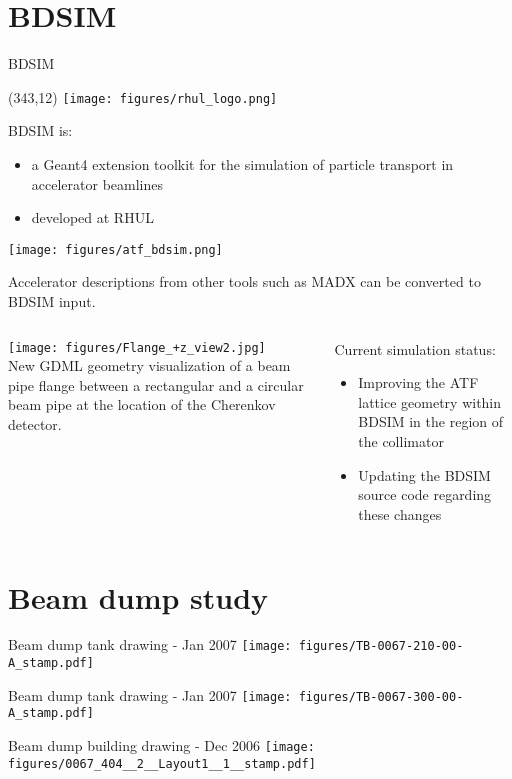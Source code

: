 \documentclass[xcolor={dvipsnames}]{beamer}
\newcommand{\rhullogo}{
  \setlength{\TPHorizModule}{1pt}
  \setlength{\TPVertModule}{1pt}
  \begin{textblock}{1}(343,12)
   \texttt{[image: figures/rhul\_logo.png]}
  \end{textblock}
}
\begin{document}
\section{BDSIM}
\begin{frame}{BDSIM}
\rhullogo
BDSIM is:
\begin{itemize}
 \item a Geant4 extension toolkit for the simulation of particle transport in accelerator beamlines
 \item developed at RHUL
\end{itemize}
 \begin{center}
 \texttt{[image: figures/atf\_bdsim.png]}
\end{center}
Accelerator descriptions from other tools such as MADX can be converted to BDSIM input.
\begin{columns}
 \begin{column}[b]{0.35\textwidth}
  \centering
   \texttt{[image: figures/Flange\_+z\_view2.jpg]}\\
   \tiny New GDML geometry visualization of a beam pipe flange between a rectangular and a circular beam
pipe at the location of the Cherenkov detector.
 \end{column}
 \begin{column}[b]{0.65\textwidth}
   Current simulation status:
\begin{itemize}
 \item Improving the ATF lattice geometry within BDSIM in the region of the collimator
 \item Updating the BDSIM source code regarding these changes
\end{itemize}
 \end{column}
\end{columns}
\end{frame}

\section{Beam dump study}
\begin{frame}{Beam dump tank drawing - Jan 2007}
 \texttt{[image: figures/TB-0067-210-00-A\_stamp.pdf]}
\end{frame}
\begin{frame}{Beam dump tank drawing - Jan 2007}
 \texttt{[image: figures/TB-0067-300-00-A\_stamp.pdf]}
\end{frame}
\begin{frame}{Beam dump building drawing - Dec 2006}
 \texttt{[image: figures/0067\_404\_\_2\_\_Layout1\_\_1\_\_stamp.pdf]}
\end{frame}
\end{document}
